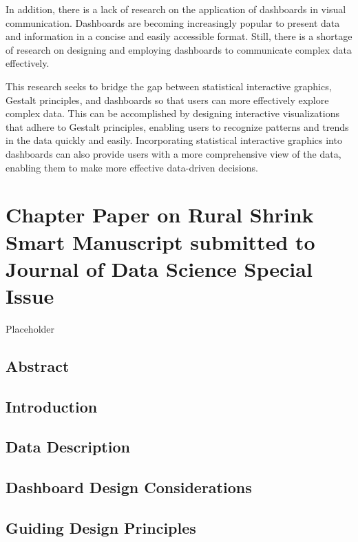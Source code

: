 \documentclass[print]{nuthesis}
\begin{document}
In addition, there is a lack of research on the application of dashboards in visual communication.
Dashboards are becoming increasingly popular to present data and information in a concise and easily accessible format.
Still, there is a shortage of research on designing and employing dashboards to communicate complex data effectively.

This research seeks to bridge the gap between statistical interactive graphics, Gestalt principles, and dashboards so that users can more effectively explore complex data.
This can be accomplished by designing interactive visualizations that adhere to Gestalt principles, enabling users to recognize patterns and trends in the data quickly and easily.
Incorporating statistical interactive graphics into dashboards can also provide users with a more comprehensive view of the data, enabling them to make more effective data-driven decisions.

\hypertarget{rmd-basics}{%
\chapter{Chapter Paper on Rural Shrink Smart Manuscript submitted to Journal of Data Science Special Issue}\label{rmd-basics}}

Placeholder

\hypertarget{abstract}{%
\section{Abstract}\label{abstract}}

\hypertarget{introduction-1}{%
\section{Introduction}\label{introduction-1}}

\hypertarget{data-description}{%
\section{Data Description}\label{data-description}}

\hypertarget{dashboard-design-considerations}{%
\section{Dashboard Design Considerations}\label{dashboard-design-considerations}}

\hypertarget{guiding-design-principles}{%
\section{Guiding Design Principles}\label{guiding-design-principles}}
\end{document}
